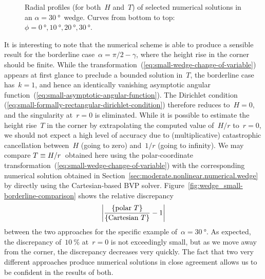 \begin{figure}
  \newcommand*{\subfigurewidth}{0.45\textwidth}
  \centering
  \begin{subfigure}[t]{\subfigurewidth}
  \end{subfigure}
    \hfill
  \begin{subfigure}[t]{\subfigurewidth}
  \end{subfigure}
  \caption{
    Radial profiles (for both~$H$ and~$T$) of selected numerical solutions
    in an $\alpha = \SI{30}{\degree}$~wedge.
    Curves from bottom to top:
    $\phi =
      \SI{0}{\degree}, \SI{10}{\degree},
      \SI{20}{\degree}, \SI{30}{\degree}$.
  }
  \label{fig:wedge_small-solution}
\end{figure}

It is interesting to note that
the numerical scheme is able to produce a sensible result
for the borderline case~$\alpha = \pi/2 - \gamma$,
where the height rise in the corner should be finite.
While the transformation~(\ref{eq:small-wedge-change-of-variable})
appears at first glance to preclude a bounded solution in~$T$,
the borderline case has~$k = 1$,
and hence an identically vanishing
asymptotic angular function~(\ref{eq:small-asymptotic-angular-function}).
The Dirichlet condition~%
  (\ref{eq:small-formally-rectangular-dirichlet-condition})
therefore reduces to~$H = 0$,
and the singularity at~$r = 0$ is eliminated.
While it is possible to estimate the height rise~$T$ in the corner
by extrapolating the computed value of~$H / r$ to~$r = 0$,
we should not expect a high level of accuracy
due to (multiplicative) catastrophic cancellation
between~$H$ (going to zero) and~$1 / r$ (going to infinity).
We may compare $T \equiv H / r$~obtained here using
the polar-coordinate transformation~(\ref{eq:small-wedge-change-of-variable})
with the corresponding numerical solution
obtained in Section~\ref{sec:moderate.nonlinear.numerical.wedge}
by directly using the Cartesian-based BVP solver.
Figure~\ref{fig:wedge_small-borderline-comparison}
shows the relative discrepancy
\begin{equation}
  \abs*{\frac{\textq{polar~$T$}}{\textq{Cartesian~$T$}} - 1}
  \label{eq:wedge_small-relative-discrepancy-with-cartesian}
\end{equation}
between the two approaches
for the specific example of~$\alpha = \SI{30}{\degree}$.
As expected,
the discrepancy of~$\SI{10}{\percent}$ at~$r = 0$
is not exceedingly small,
but as we move away from the corner,
the discrepancy decreases very quickly.
The fact that two very different approaches
produce numerical solutions in close agreement
allows us to be confident in the results of both.

